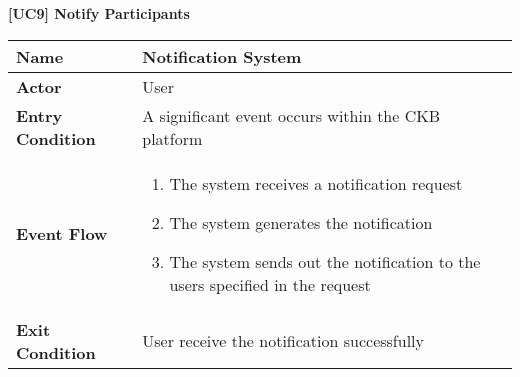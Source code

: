 \documentclass{article}
\begin{document}
\begin{table}
 \renewcommand{\arraystretch}{1.5}
    \centering
    \raggedright\textbf{[UC9] Notify Participants}
    \begin{tabular}{|l|p{10cm}|}
        \hline
        \textbf{Name} & Notification System \\
        \hline
        \textbf{Actor} & User \\
        \hline
        \textbf{Entry Condition} & A significant event occurs within the CKB platform\\
        \hline
        \textbf{Event Flow} & 
        \begin{enumerate}[align=left, topsep=0pt, partopsep=0pt]
            \item The system receives a notification request
            \item The system generates the notification
            \item The system sends out the notification to the users specified in the request
        \end{enumerate} \\
        \hline
        \textbf{Exit Condition} & User receive the notification successfully \\
        \hline
    \end{tabular}
\end{table}
\end{document}
